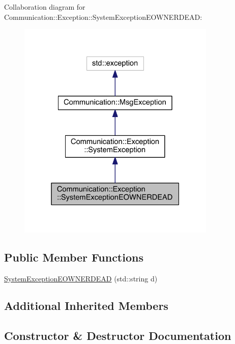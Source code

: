 Collaboration diagram for Communication\+:\+:Exception\+:\+:System\+Exception\+E\+O\+W\+N\+E\+R\+D\+E\+A\+D\+:\nopagebreak
\begin{figure}[H]
\begin{center}
\leavevmode
\includegraphics[width=268pt]{class_communication_1_1_exception_1_1_system_exception_e_o_w_n_e_r_d_e_a_d__coll__graph}
\end{center}
\end{figure}
\subsection*{Public Member Functions}
\begin{DoxyCompactItemize}
\item 
\hyperlink{class_communication_1_1_exception_1_1_system_exception_e_o_w_n_e_r_d_e_a_d_a89ed26ca9ceecead3fb8fc47ba47954f}{System\+Exception\+E\+O\+W\+N\+E\+R\+D\+E\+A\+D} (std\+::string d)
\end{DoxyCompactItemize}
\subsection*{Additional Inherited Members}


\subsection{Constructor \& Destructor Documentation}
\hypertarget{class_communication_1_1_exception_1_1_system_exception_e_o_w_n_e_r_d_e_a_d_a89ed26ca9ceecead3fb8fc47ba47954f}{}
